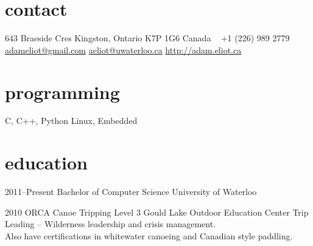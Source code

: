 \documentclass[]{eliot-cv} %
\begin{document}


\begin{aside} %
\section{contact}
643 Braeside Cres
Kingston, Ontario 
K7P 1G6
Canada
~
+1 (226) 989 2779
~
\href{mailto:adameliot@gmail.com}{adameliot@gmail.com}
\href{mailto:aeliot@uwaterloo.ca}{aeliot@uwaterloo.ca}
\href{http://adam.eliot.ca}{http://adam.eliot.ca}
\section{programming}
C, C++, Python
Linux, Embedded
\end{aside}


\section{education}

\begin{entrylist}
\entry
{2011--Present}
{Bachelor {\normalfont of Computer Science}}
{University of Waterloo}
{}

\entry
{2010}
{ORCA {\normalfont Canoe Tripping Level 3}}
{Gould Lake Outdoor Education Center}
{Trip Leading -- Wilderness leadership and crisis management. \\
Also have certifications in whitewater canoeing and Canadian style paddling.}

\end{entrylist}

\end{document}
